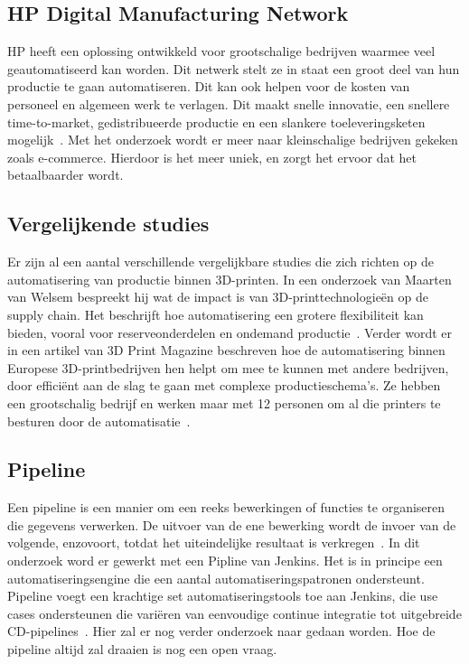 \subsection{HP Digital Manufacturing Network}%

HP heeft een oplossing ontwikkeld voor grootschalige bedrijven waarmee veel geautomatiseerd kan worden. Dit netwerk stelt ze in staat een groot deel van hun productie te gaan automatiseren. Dit kan ook helpen voor de kosten van personeel en algemeen werk te verlagen. Dit maakt snelle innovatie, een snellere time-to-market, gedistribueerde productie en een slankere toeleveringsketen mogelijk~\autocite{hp3DprintingNetwork}. Met het onderzoek wordt er meer naar kleinschalige bedrijven gekeken zoals e-commerce. Hierdoor is het meer uniek, en zorgt het ervoor dat het betaalbaarder wordt.



\subsection{Vergelijkende studies}%

Er zijn al een aantal verschillende vergelijkbare studies die zich richten op de automatisering van productie binnen 3D-printen. In een onderzoek van Maarten van Welsem bespreekt hij wat de impact is van 3D-printtechnologieën op de supply chain. Het beschrijft hoe automatisering een grotere flexibiliteit kan bieden, vooral voor reserveonderdelen en ondemand productie~\autocite{emerce3DprintSupplyChain}. Verder wordt er in een artikel van 3D Print Magazine beschreven hoe de automatisering binnen Europese 3D-printbedrijven hen helpt om mee te kunnen met andere bedrijven, door efficiënt aan de slag te gaan met complexe productieschema's. Ze hebben een grootschalig bedrijf en werken maar met 12 personen om al die printers te besturen door de automatisatie~\autocite{3dprintmagAutomation}. 


\subsection{Pipeline}%

Een pipeline is een manier om een ​​reeks bewerkingen of functies te organiseren die gegevens verwerken. De uitvoer van de ene bewerking wordt de invoer van de volgende, enzovoort, totdat het uiteindelijke resultaat is verkregen~\autocite{pythonPipelinesThakur}. In dit onderzoek word er gewerkt met een Pipline van Jenkins. Het is in principe een automatiseringsengine die een aantal automatiseringspatronen ondersteunt. Pipeline voegt een krachtige set automatiseringstools toe aan Jenkins, die use cases ondersteunen die variëren van eenvoudige continue integratie tot uitgebreide CD-pipelines~\autocite{jenkinsPipeline}. Hier zal er nog verder onderzoek naar gedaan worden. Hoe de pipeline altijd zal draaien is nog een open vraag.

